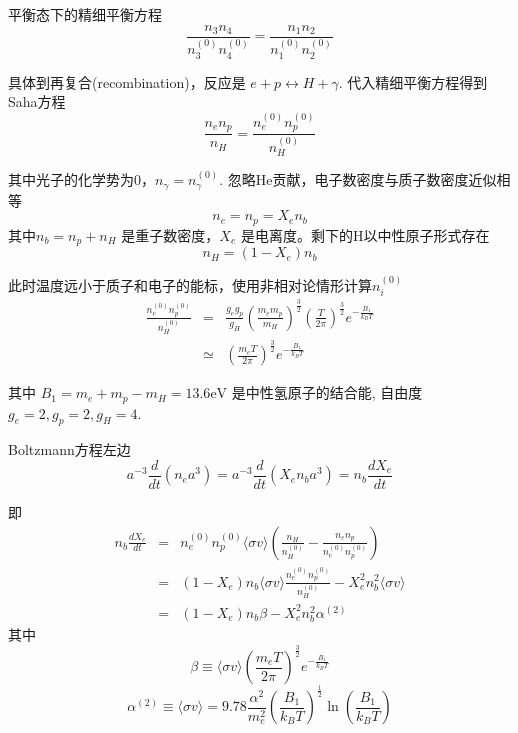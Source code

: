 \documentclass[12pt]{ctexart}
\begin{document}
平衡态下的精细平衡方程
\begin{equation}
    \frac{n_{3} n_{4}}{n_{3}^{(0)} n_{4}^{(0)}}=\frac{n_{1} n_{2}}{n_{1}^{(0)} n_{2}^{(0)}}
\end{equation}

具体到再复合(recombination)，反应是 $e+p \leftrightarrow H+\gamma$.
代入精细平衡方程得到Saha方程
\begin{equation}
    \frac{n_{e}n_p}{n_{H}}=\frac{n_{e}^{(0)} n_{p}^{(0)}}{n_{H}^{(0)}}
\end{equation}

其中光子的化学势为0，$n_\gamma = n_{\gamma}^{(0)}$.
忽略He贡献，电子数密度与质子数密度近似相等
$$n_{e}=n_{p}=X_{e} n_{b}$$
其中$n_{b}=n_{p}+n_{H}$ 是重子数密度，$X_e$ 是电离度。剩下的H以中性原子形式存在
$$n_{H}=\left(1 - X_{e}\right) n_{b}$$

此时温度远小于质子和电子的能标，使用非相对论情形计算$n_i^{(0)}$
\begin{eqnarray}
      \frac{n_{e}^{(0)} n_{p}^{(0)}}{n_{H}^{(0)}} &=& \frac{g_e g_p}{g_H} \left(\frac{m_e m_p}{m_H}\right)^\frac{3}{2} \left(\frac{T}{2\pi }\right)^\frac{3 }{2} e^{-\frac{B_1}{k_B T}} \\ 
      &\simeq&\left(\frac{m_e T}{2\pi }\right)^\frac{3 }{2} e^{-\frac{B_1}{k_B T}}
\end{eqnarray}

  
其中 $B_1=m_e+m_p - m_H=13.6\mathrm{eV}$ 是中性氢原子的结合能, 自由度 $g_e=2,g_p=2,g_H=4$.

Boltzmann方程左边
\begin{equation}
    a^{-3} \frac{d}{d t}\left(n_{e} a^{3}\right)= a^{-3} \frac{d}{d t}\left(X_{e} n_{b} a^{3}\right) = n_b \frac{d X_e}{dt}
\end{equation}

即
\begin{eqnarray}
    n_b \frac{d X_e}{dt} &=& n_{e}^{(0)} n_{p}^{(0)}\langle\sigma v\rangle\left(\frac{n_H}{n_{H}^{(0)}}-\frac{n_{e} n_{p}}{n_{e}^{(0)} n_{p}^{(0)}}\right)   \\ 
    &=& (1-X_e) n_b \langle\sigma v\rangle \frac{n_{e}^{(0)} n_{p}^{(0)}}{n_H^{(0)}} - X_e^2 n_b^2 \langle\sigma v\rangle \\
    &=& (1-X_e) n_b \beta  - X_e^2 n_b^2 \alpha^{(2)}
\end{eqnarray}
其中
\begin{equation}
    \beta \equiv \langle\sigma v\rangle\left(\frac{m_{e} T}{2 \pi}\right)^\frac{3 }{2} e^{-\frac{B_1}{k_B T}}
\end{equation}
\begin{equation}
    \alpha^{(2)} \equiv \langle\sigma v\rangle=9.78 \frac{\alpha^{2}}{m_{e}^{2}}\left(\frac{B_{1}}{k_{B} T}\right)^\frac{1 }{2} \ln \left(\frac{B_{1}}{k_{B} T}\right)
\end{equation}
\end{document}
